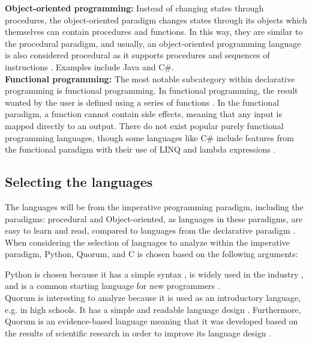 \noindent
\textbf{Object-oriented programming:} Instead of changing states through procedures, the object-oriented paradigm changes states through its objects which themselves can contain procedures and functions. In this way, they are similar to the procedural paradigm, and usually, an object-oriented programming language is also considered procedural as it supports procedures and sequences of instructions \cite{WikiProgrammingParadigms}. Examples include Java and C\#. \\

\noindent
\textbf{Functional programming:} The most notable subcategory within declarative programming is functional programming. In functional programming, the result wanted by the user is defined using a series of functions \cite{FunctionalProgrammingParadigm}. In the functional paradigm, a function cannot contain side effects, meaning that any input is mapped directly to an output. There do not exist popular purely functional programming languages, though some languages like C\# include features from the functional paradigm with their use of LINQ and lambda expressions \cite{FunctionalProgrammingParadigm}. \\

\subsection{Selecting the languages} \label{SelectionLang}
The languages will be from the imperative programming paradigm, including the paradigms: procedural and Object-oriented, as languages in these paradigms, are easy to learn and read, compared to languages from the declarative paradigm \cite{ProgrammingParadigme}.\\

When considering the selection of languages to analyze within the imperative paradigm, Python, Quorum, and C is chosen based on the following arguments:

Python is chosen because it has a simple syntax \cite{PythonLanguageReference}, is widely used in the industry \cite{TopProgrammingLanguages2022}, and is a common starting language for new programmers \cite{PythonBeginnerProgrammingLanguage}. \\

Quorum is interesting to analyze because it is used as an introductory language, e.g. in high schools. It has a simple and readable language design \cite{QuorumVid}. Furthermore, Quorum is an evidence-based language meaning that it was developed based on the results of scientific research in order to improve its language design \cite{QuorumProgLang}.\\

